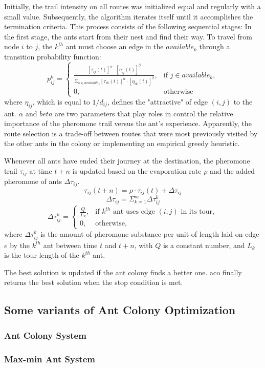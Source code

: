 Initially, the trail intensity on all routes was initialized equal and regularly with a small value. Subsequently, the algorithm iterates itself until it accomplishes the termination criteria. This process consists of the following sequential stages: In the first stage, the ants start from their nest and find their way. To travel from node $i$ to $j$, the $k^{th}$ ant must choose an edge in the $available_k$ through a transition probability function:
\begin{equation}
\label{eq:aco_transition}
p^k_{ij} =
\begin{cases}
	\frac{[\tau_{ij}(t)]^{\alpha} \cdot [\eta_{ij}(t)]^{\beta}} {\Sigma_{k \in available_k} [\tau_{ik}(t)]^{\alpha}\cdot [\eta_{ik}(t)]^{\beta}}, & \text{if $j \in available_k$}, \\
	0, & \text{otherwise}
\end{cases}
\end{equation}
where $\eta_{ij}$, which is equal to $1/d_{ij}$, defines the "attractive" of edge $(i,j)$ to the ant. $\alpha$ and $beta$ are two parameters that play roles in control the relative importance of the pheromone trail versus the ant's experience. Apparently, the route selection is a trade-off between routes that were most previously visited by the other ants in the colony or implementing an empirical greedy heuristic. 

Whenever all ants have ended their journey at the destination, the pheromone trail $\tau_{ij}$ at time $t+n$ is updated based on the evaporation rate $\rho$ and the added pheromone of ants $\Delta \tau_{ij}$.  
\begin{equation}
	\label{eq:aco_update}
	\tau_{ij}(t+n) = \rho \cdot \tau_{ij}(t) + \Delta \tau_{ij}
\end{equation}
\begin{equation}
	\label{equa:aco_add}
	\Delta \tau_{ij} = \Sigma^m_{k=1} \Delta \tau_{ij}^k
\end{equation}
\begin{equation}
	\label{equa:aco_pher}
	\Delta \tau_{ij}^k = 
	\begin{cases}
		\frac{Q}{L_k} , & \text{if $k^{th}$ ant uses edge $(i,j)$ in its tour},\\
		0, & \text{otherwise},
	\end{cases}  
\end{equation}
where $\Delta \tau_{ij}^k$ is the amount of pheromone substance per unit of length laid on edge $e$ by the $k^{th}$ ant between time $t$ and $t + n$, with $Q$ is a constant number, and $L_k$ is the tour length of the $k^{th}$ ant.

The best solution is updated if the ant colony finds a better one. \gls{aco} finally returns the best solution when the stop condition is met.

\subsection{Some variants of Ant Colony Optimization}
\subsubsection{Ant Colony System}

\subsubsection{Max-min Ant System}
